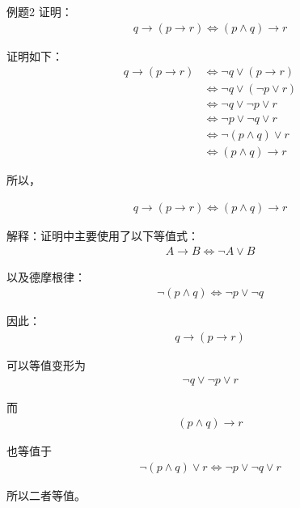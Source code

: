 \begin{question}{例题2}
	证明：
	\begin{align*}
		q \to (p \to r) \Leftrightarrow (p \land q) \to r
	\end{align*}
	
	证明如下：
	\begin{align*}
		q \to (p \to r)
		&\Leftrightarrow \neg q \lor (p \to r) \\
		&\Leftrightarrow \neg q \lor (\neg p \lor r) \\
		&\Leftrightarrow \neg q \lor \neg p \lor r \\
		&\Leftrightarrow \neg p \lor \neg q \lor r \\
		&\Leftrightarrow \neg(p \land q) \lor r \\
		&\Leftrightarrow (p \land q) \to r
	\end{align*}
	
	所以，
	
	\begin{align*}
		q \to (p \to r) \Leftrightarrow (p \land q) \to r
	\end{align*}
	
	解释：证明中主要使用了以下等值式：
	\begin{align*}
		A \to B \Leftrightarrow \neg A \lor B
	\end{align*}
	
	以及德摩根律：
	\begin{align*}
		\neg(p \land q) \Leftrightarrow \neg p \lor \neg q
	\end{align*}
	
	因此：
	\begin{align*}
		q \to (p \to r)
	\end{align*}
	
	可以等值变形为
	\begin{align*}
		\neg q \lor \neg p \lor r
	\end{align*}
	
	而
	\begin{align*}
		(p \land q) \to r
	\end{align*}
	
	也等值于
	\begin{align*}
		\neg(p \land q) \lor r
		\Leftrightarrow \neg p \lor \neg q \lor r
	\end{align*}
	
	所以二者等值。
\end{question}

